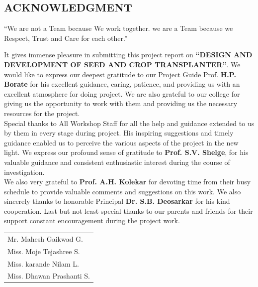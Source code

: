 \documentclass[12pt,a4paper]{article}
\numberwithin{figure}{section}
\numberwithin{table}{section}
\begin{document}
\begin{center}
\section*{ACKNOWLEDGMENT}
\end{center}
\begin{center}
“We are not a Team because We work together. we are a Team because we Respect, Trust and
Care for each other.”
\end{center}
It gives immense pleasure in submitting this project report on \textbf{“DESIGN AND
DEVELOPMENT OF SEED AND CROP TRANSPLANTER”}. We would like to express our
deepest gratitude to our Project Guide Prof. \textbf{H.P. Borate} for his excellent guidance, caring,
patience, and providing us with an excellent atmosphere for doing project. We are also grateful to
our college for giving us the opportunity to work with them and providing us the necessary
resources for the project.\\
Special thanks to All Workshop Staff for all the help and guidance extended to us by them in
every stage during project. His inspiring suggestions and timely guidance enabled us to perceive
the various aspects of the project in the new light.
We express our profound sense of gratitude to \textbf{Prof. S.V. Shelge}, for his valuable guidance and
consistent enthusiastic interest during the course of investigation.\\
We also very grateful to \textbf{Prof. A.H. Kolekar} for devoting time from their busy schedule to provide
valuable comments and suggestions on this work. We also sincerely thanks to honorable Principal \textbf{Dr. S.B. Deosarkar }for his kind cooperation.
Last but not least special thanks to our parents and friends for their support constant
encouragement during the project work.

\vspace{1cm}
\begin{flushright}
\begin{tabular}{l}

Mr. Mahesh Gaikwad G. \\
Miss. Moje Tejashree S. \\
Miss. karande Nilam L. \\
Miss. Dhawan Prashanti S.\\

\end{tabular}
\end{flushright}
\end{document}
